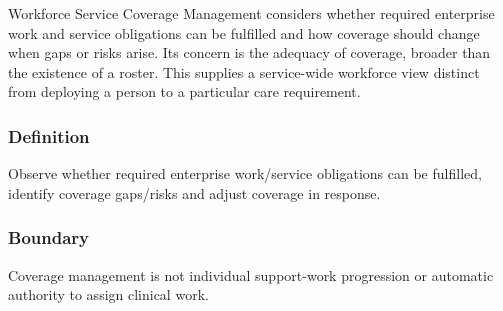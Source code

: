 Workforce Service Coverage Management considers whether required enterprise work and service obligations can be fulfilled and how coverage should change when gaps or risks arise. Its concern is the adequacy of coverage, broader than the existence of a roster. This supplies a service-wide workforce view distinct from deploying a person to a particular care requirement.

\subsubsection*{Definition}

Observe whether required enterprise work/\allowbreak{}service obligations can be fulfilled, identify coverage gaps/\allowbreak{}risks and adjust coverage in response.

\subsubsection*{Boundary}

Coverage management is not individual support-work progression or automatic authority to assign clinical work.

